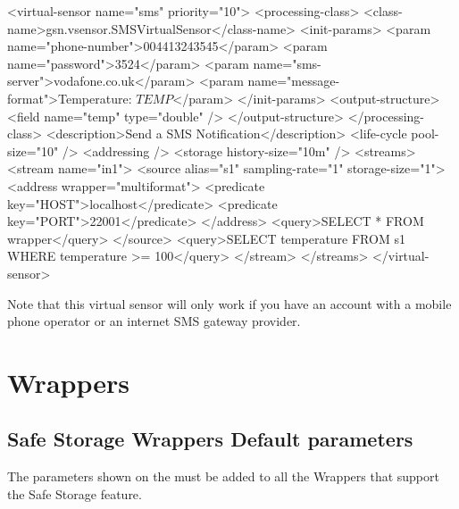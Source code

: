 \begin{xmlcode}[caption={Sample of SMS Notification VSD file}, label=listing:xml:smsnotification_vsd]
<virtual-sensor name="sms" priority="10">
	<processing-class>
		<class-name>gsn.vsensor.SMSVirtualSensor</class-name>
		<init-params>
			<param name="phone-number">004413243545</param>
			<param name="password">3524</param>
			<param name="sms-server">vodafone.co.uk</param>
			<param name="message-format">Temperature: $TEMP$</param>
		</init-params>
		<output-structure>
			<field name="temp" type="double" />
		</output-structure>
	</processing-class>
	<description>Send a SMS Notification</description>
	<life-cycle pool-size="10" />
	<addressing />
	<storage history-size="10m" />
	<streams>
		<stream name="in1">
			<source alias="s1" sampling-rate="1" storage-size="1">
				<address wrapper="multiformat">
					<predicate key="HOST">localhost</predicate>
					<predicate key="PORT">22001</predicate>
				</address>
				<query>SELECT * FROM wrapper</query>
			</source>
			<query>SELECT temperature FROM s1 WHERE temperature >= 100</query>
		</stream>
	</streams>
</virtual-sensor>
\end{xmlcode}

Note that this virtual sensor will only work if you have an account with a mobile phone operator or an internet SMS gateway provider. 

\section{Wrappers}

\subsection{Safe Storage Wrappers Default parameters}

The parameters shown on the  must be added to all the Wrappers that support the 
Safe Storage feature.

